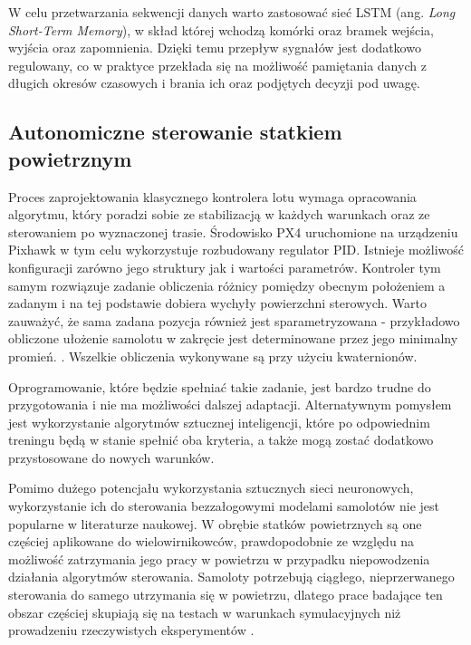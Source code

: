 \documentclass[12pt, a4paper]{article}
\begin{document}
W celu przetwarzania sekwencji danych warto zastosować sieć LSTM (ang. \textit{Long Short-Term Memory}), w skład której wchodzą komórki oraz bramek wejścia, wyjścia oraz zapomnienia. Dzięki temu przepływ sygnałów jest dodatkowo regulowany, co w praktyce przekłada się na możliwość pamiętania danych z długich okresów czasowych i brania ich oraz podjętych decyzji pod uwagę. 

\subsection{Autonomiczne sterowanie statkiem powietrznym}

Proces zaprojektowania klasycznego kontrolera lotu wymaga opracowania algorytmu, który poradzi sobie ze stabilizacją w każdych warunkach oraz ze sterowaniem po wyznaczonej trasie. Środowisko PX4 uruchomione na urządzeniu Pixhawk w tym celu wykorzystuje rozbudowany regulator PID. Istnieje możliwość konfiguracji zarówno jego struktury jak i wartości parametrów. Kontroler tym samym rozwiązuje zadanie obliczenia różnicy pomiędzy obecnym położeniem a zadanym i na tej podstawie dobiera wychyły powierzchni sterowych\cite{https://docs.px4.io/main/en/config_mc/pid_tuning_guide_multicopter.html}. Warto zauważyć, że sama zadana pozycja również jest sparametryzowana - przykładowo obliczone ułożenie samolotu w zakręcie jest determinowane przez jego minimalny promień. \cite{https://docs.px4.io/main/en/flight_stack/controller_diagrams.html}. Wszelkie obliczenia wykonywane są przy użyciu kwaternionów.

Oprogramowanie, które będzie spełniać takie zadanie, jest bardzo trudne do przygotowania i nie ma możliwości dalszej adaptacji. Alternatywnym pomysłem jest wykorzystanie algorytmów sztucznej inteligencji, które po odpowiednim treningu będą w stanie spełnić oba kryteria, a także mogą zostać dodatkowo przystosowane do nowych warunków.

Pomimo dużego potencjału wykorzystania sztucznych sieci neuronowych, wykorzystanie ich do sterowania bezzałogowymi modelami samolotów nie jest popularne w literaturze naukowej. W obrębie statków powietrznych są one częściej aplikowane do wielowirnikowców, prawdopodobnie ze względu na możliwość zatrzymania jego pracy w powietrzu w przypadku niepowodzenia działania algorytmów sterowania. Samoloty potrzebują ciągłego, nieprzerwanego sterowania do samego utrzymania się w powietrzu, dlatego prace badające ten obszar częściej skupiają się na testach w warunkach symulacyjnych niż prowadzeniu rzeczywistych eksperymentów \cite{glowny}. 
\end{document}
